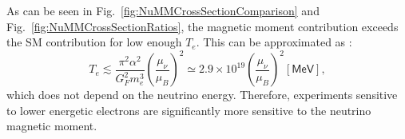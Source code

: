 As can be seen in Fig.~\ref{fig:NuMMCrossSectionComparison} and Fig.~\ref{fig:NuMMCrossSectionRatios}, the magnetic moment contribution exceeds the \gls{SM} contribution for low enough $T_e$. This can be approximated as \cite{nuElmagInt2015.pdf}:
\begin{equation}
T_e\lesssim\frac{\pi^2\alpha^2}{G_F^2m_e^3}\left(\frac{\mu_{\nu}}{\mu_B}\right)^2\simeq 2.9\times 10^{19}\left(\frac{\mu_{\nu}}{\mu_B}\right)^2\left[\textsf{MeV}\right],
\end{equation}
which does not depend on the neutrino energy. Therefore, experiments sensitive to lower energetic electrons are significantly more sensitive to the neutrino magnetic moment.